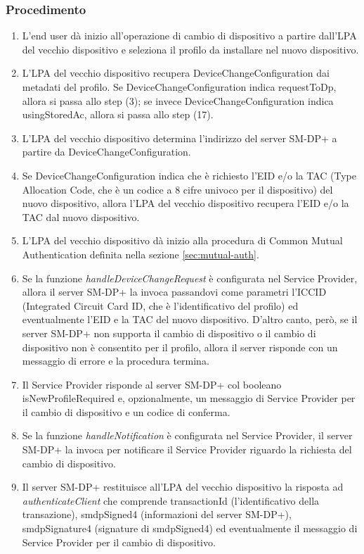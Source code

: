 \documentclass[10pt, oneside]{book}
\begin{document}
\subsubsection{Procedimento}
\begin{enumerate}
\item L'end user dà inizio all'operazione di cambio di dispositivo a partire dall'LPA del vecchio dispositivo e seleziona il profilo da installare nel nuovo dispositivo.
\item L'LPA del vecchio dispositivo recupera DeviceChangeConfiguration dai metadati del profilo. Se DeviceChangeConfiguration indica requestToDp, allora si passa allo step (3); se invece DeviceChangeConfiguration indica usingStoredAc, allora si passa allo step (17).
\item L'LPA del vecchio dispositivo determina l'indirizzo del server SM-DP+ a partire da DeviceChangeConfiguration.
\item Se DeviceChangeConfiguration indica che è richiesto l'EID e/o la TAC (Type Allocation Code, che è un codice a 8 cifre univoco per il dispositivo) del nuovo dispositivo, allora l'LPA del vecchio dispositivo recupera l'EID e/o la TAC dal nuovo dispositivo.
\item L'LPA del vecchio dispositivo dà inizio alla procedura di Common Mutual Authentication definita nella sezione \ref{sec:mutual-auth}.
\item Se la funzione \textit{handleDeviceChangeRequest} è configurata nel Service Provider, allora il server SM-DP+ la invoca passandovi come parametri l'ICCID (Integrated Circuit Card ID, che è l'identificativo del profilo) ed eventualmente l'EID e la TAC del nuovo dispositivo. D'altro canto, però, se il server SM-DP+ non supporta il cambio di dispositivo o il cambio di dispositivo non è consentito per il profilo, allora il server risponde con un messaggio di errore e la procedura termina.
\item Il Service Provider risponde al server SM-DP+ col booleano isNewProfileRequired e, opzionalmente, un messaggio di Service Provider per il cambio di dispositivo e un codice di conferma.
\item Se la funzione \textit{handleNotification} è configurata nel Service Provider, il server SM-DP+ la invoca per notificare il Service Provider riguardo la richiesta del cambio di dispositivo.
\item Il server SM-DP+ restituisce all'LPA del vecchio dispositivo la risposta ad \textit{authenticateClient} che comprende transactionId (l'identificativo della transazione), smdpSigned4 (informazioni del server SM-DP+), smdpSignature4 (signature di smdpSigned4) ed eventualmente il messaggio di Service Provider per il cambio di dispositivo.

\end{enumerate}
\end{document}
